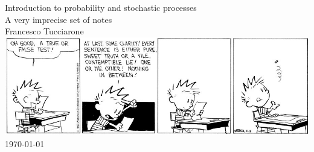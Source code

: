 
\begin{titlepage}
    \centering
    \vfill
    \vfill
    {\Large Introduction to probability and stochastic processes}\\ 
    \null
    {\normalsize A very imprecise set of notes}\\
    \null
    \medskip
    {\large Francesco Tucciarone}\\
    \vfill
    \vfill
    \includegraphics[scale=0.5]{./Front/Front_Img.jpeg}\\ %
    \vfill
    \today
\end{titlepage}

\newpage

\null
\newpage
{}      %
\tableofcontents           %

\newpage
\null
\thispagestyle{empty}      %
\newpage
{}     %
